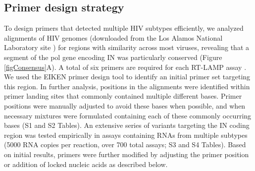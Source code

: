 \documentclass[../sherrill-Mix_thesis.tex]{subfiles}
\begin{document}
	\subsection{Primer design strategy}
		To design primers that detected multiple HIV subtypes efficiently, we analyzed alignments of HIV genomes (downloaded from the Los Alamos National Laboratory site \citep{Kuiken2013}) for regions with similarity across most viruses, revealing that a segment of the pol gene encoding IN was particularly conserved (Figure \ref{figConsensus}A). A total of six primers are required for each RT-LAMP assay \citep{Notomi2000}. We used the EIKEN primer design tool to identify an initial primer set targeting this region. In further analysis, positions in the alignments were identified within primer landing sites that commonly contained multiple different bases. Primer positions were manually adjusted to avoid these bases when possible, and when necessary mixtures were formulated containing each of these commonly occurring bases (S1 and S2 Tables). An extensive series of variants targeting the IN coding region was tested empirically in assays containing RNAs from multiple subtypes (5000 RNA copies per reaction, over 700 total assays; S3 and S4 Tables). Based on initial results, primers were further modified by adjusting the primer position or addition of locked nucleic acids as described below.
\end{document}
